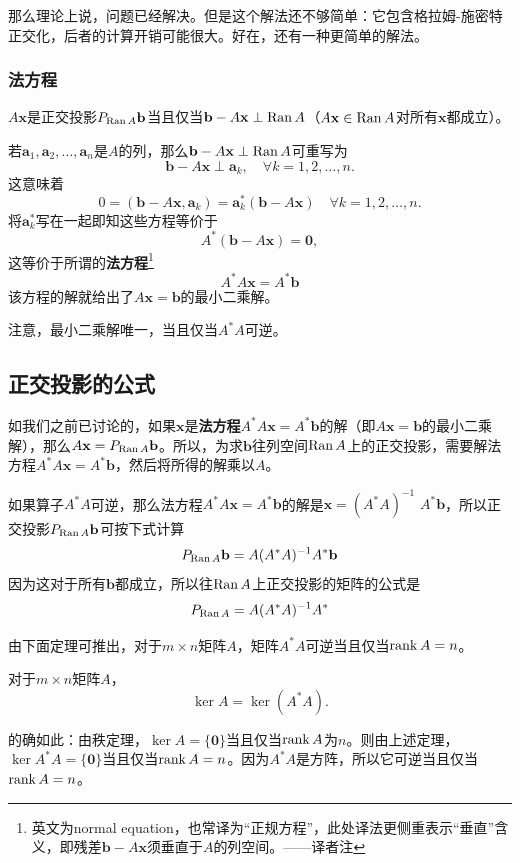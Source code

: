那么理论上说，问题已经解决。但是这个解法还不够简单：它包含格拉姆-施密特正交化，后者的计算开销可能很大。好在，还有一种更简单的解法。

\subsubsection{法方程}

$A\mathbf{x}$是正交投影$P_{\operatorname{Ran} A}\mathbf{b}$当且仅当$\mathbf{b}-A\mathbf{x}\perp\operatorname{Ran} A$（$A\mathbf{x}\in\operatorname{Ran} A$对所有$\mathbf{x}$都成立）。

若$\mathbf{a}_{1},\mathbf{a}_{2},\ldots,\mathbf{a}_{n}$是$A$的列，那么$\mathbf{b}-A\mathbf{x}\perp\operatorname{Ran} A$可重写为
\[\mathbf{b}-A\mathbf{x}\perp\mathbf{a}_{k},\quad\forall k=1,2,\ldots,n.\]
这意味着\[0=(\mathbf{b}-A\mathbf{x},\mathbf{a}_k)=\mathbf{a}_k^*(\mathbf{b}-A\mathbf{x})\quad\forall k=1,2,\ldots,n.\]
将$\mathbf{a}_k^*$写在一起即知这些方程等价于\[A^*(\mathbf{b}-A\mathbf{x})=\mathbf{0},\]
这等价于所谓的\textbf{法方程}\footnote{英文为normal equation，也常译为“正规方程”，此处译法更侧重表示“垂直”含义，即残差$\mathbf{b}-A\mathbf{x}$须垂直于$A$的列空间。——译者注}
\[A^*A\mathbf{x}=A^*\mathbf{b}\]
该方程的解就给出了$A\mathbf{x}=\mathbf{b}$的最小二乘解。

注意，最小二乘解唯一，当且仅当$A^*A$可逆。

\subsection{正交投影的公式}

如我们之前已讨论的，如果$\mathbf{x}$是\textbf{法方程}$A^*A\mathbf{x}=A^*\mathbf{b}$的解（即$A\mathbf{x}=\mathbf{b}$的最小二乘解），那么$A\mathbf{x}=P_{\operatorname{Ran} A}\mathbf{b}$。所以，为求$\mathbf{b}$往列空间$\operatorname{Ran} A$上的正交投影，需要解法方程$A^*A\mathbf{x}=A^*\mathbf{b}$，然后将所得的解乘以$A$。

如果算子$A^*A$可逆，那么法方程$A^*A\mathbf{x}=A^*\mathbf{b}$的解是$\mathbf{x}=(A^*A)^{-1}$ $A^*\mathbf{b}$，所以正交投影$P_{\operatorname{Ran} A}\mathbf{b}$可按下式计算\[P_{\operatorname{Ran} A}\mathbf{b}=A(A^*A)^{-1}A^*\mathbf{b}\]
因为这对于所有$\mathbf{b}$都成立，所以往$\operatorname{Ran} A$上正交投影的矩阵的公式是\[P_{\operatorname{Ran} A}=A(A^*A)^{-1}A^*\]

由下面定理可推出，对于$m\times n$矩阵$A$，矩阵$A^*A$可逆当且仅当$\operatorname{rank} A=n$。

\begin{theorem}
    对于$m\times n$矩阵$A$，\[\ker A = \ker(A^*A).\]
\end{theorem}

的确如此：由秩定理，$\ker A=\{\mathbf{0}\}$当且仅当$\operatorname{rank} A$为$n$。则由上述定理，$\ker A^*A=\{\mathbf{0}\}$当且仅当$\operatorname{rank} A=n$。因为$A^*A$是方阵，所以它可逆当且仅当$\operatorname{rank} A=n$。

